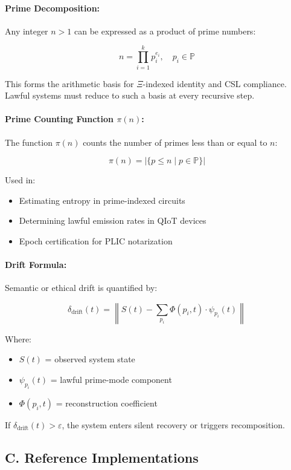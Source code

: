 \documentclass[12]{amsart}
\theoremstyle{plain}
\begin{document}
\paragraph{Prime Decomposition:}
Any integer $n > 1$ can be expressed as a product of prime numbers:

\[
n = \prod_{i=1}^{k} p_i^{e_i}, \quad p_i \in \mathbb{P}
\]

This forms the arithmetic basis for $\Xi$-indexed identity and CSL compliance. Lawful systems must reduce to such a basis at every recursive step.

\paragraph{Prime Counting Function $\pi(n)$:}
The function $\pi(n)$ counts the number of primes less than or equal to $n$:

\[
\pi(n) = |\{ p \leq n \mid p \in \mathbb{P} \}|
\]

Used in:
\begin{itemize}
  \item Estimating entropy in prime-indexed circuits
  \item Determining lawful emission rates in QIoT devices
  \item Epoch certification for PLIC notarization
\end{itemize}

\paragraph{Drift Formula:}
Semantic or ethical drift is quantified by:

\[
\delta_{\text{drift}}(t) = \left\| S(t) - \sum_{p_i} \Phi(p_i, t) \cdot \psi_{p_i}(t) \right\|
\]

Where:
\begin{itemize}
  \item $S(t)$ = observed system state
  \item $\psi_{p_i}(t)$ = lawful prime-mode component
  \item $\Phi(p_i, t)$ = reconstruction coefficient
\end{itemize}

If $\delta_{\text{drift}}(t) > \varepsilon$, the system enters silent recovery or triggers recomposition.

\subsection*{C. Reference Implementations}
\label{appendix:reference_impl}
\end{document}
